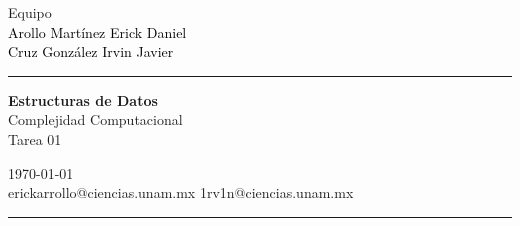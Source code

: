 \documentclass[a4paper,10pt]{article}
\begin{document}
\fancyhead[C]{}
\begin{minipage}{0.295\textwidth} 
\raggedright
Equipo\\    
\footnotesize 
\colorbox[rgb]{0.67, 0.88, 0.69}{\textcolor{black}{Arollo Martínez Erick Daniel}}
\\\colorbox[rgb]{0.96, 0.76, 0.76}{\textcolor{black}{Cruz González Irvin Javier}}
\textcolor[rgb]{0.0, 0.72, 0.92}{\medskip\hrule}
\end{minipage}
\begin{minipage}{0.4\textwidth} 
\centering 
\large 
\textbf{Estructuras de Datos}\\ 
\normalsize 
Complejidad Computacional\\Tarea 01\\
\end{minipage}
\begin{minipage}{0.295\textwidth} 
\raggedleft
\today\\ 
\footnotesize
erickarrollo@ciencias.unam.mx
1rv1n@ciencias.unam.mx
\textcolor[rgb]{0.0, 0.72, 0.92}{\medskip\hrule}
\end{minipage}
\end{document}
